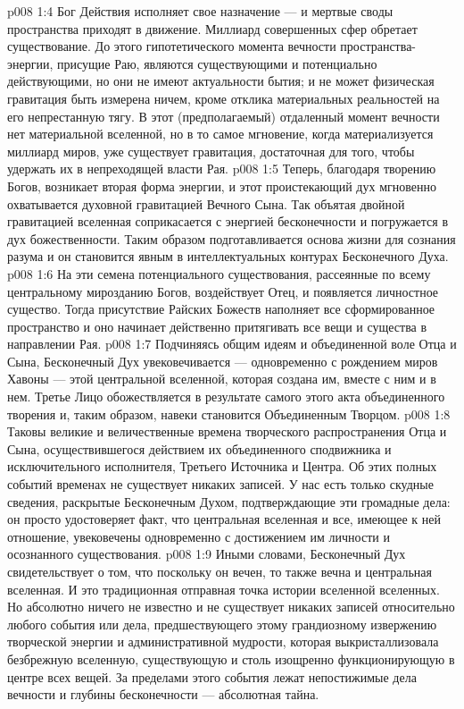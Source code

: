 \vs p008 1:4 \pc Бог Действия исполняет свое назначение --- и мертвые своды пространства приходят в движение. Миллиард совершенных сфер обретает существование. До этого гипотетического момента вечности пространства\hyp{}энергии, присущие Раю, являются существующими и потенциально действующими, но они не имеют актуальности бытия; и не может физическая гравитация быть измерена ничем, кроме отклика материальных реальностей на его непрестанную тягу. В этот (предполагаемый) отдаленный момент вечности нет материальной вселенной, но в то самое мгновение, когда материализуется миллиард миров, уже существует гравитация, достаточная для того, чтобы удержать их в непреходящей власти Рая.
\vs p008 1:5 Теперь, благодаря творению Богов, возникает вторая форма энергии, и этот проистекающий дух мгновенно охватывается духовной гравитацией Вечного Сына. Так объятая двойной гравитацией вселенная соприкасается с энергией бесконечности и погружается в дух божественности. Таким образом подготавливается основа жизни для сознания разума и он становится явным в интеллектуальных контурах Бесконечного Духа.
\vs p008 1:6 На эти семена потенциального существования, рассеянные по всему центральному мирозданию Богов, воздействует Отец, и появляется личностное существо. Тогда присутствие Райских Божеств наполняет все сформированное пространство и оно начинает действенно притягивать все вещи и существа в направлении Рая.
\vs p008 1:7 \pc Подчиняясь общим идеям и объединенной воле Отца и Сына, Бесконечный Дух увековечивается --- одновременно с рождением миров Хавоны --- этой центральной вселенной, которая создана им, вместе с ним и в нем. Третье Лицо обожествляется в результате самого этого акта объединенного творения и, таким образом, навеки становится Объединенным Творцом.
\vs p008 1:8 \pc Таковы великие и величественные времена творческого распространения Отца и Сына, осуществившегося действием их объединенного сподвижника и исключительного исполнителя, Третьего Источника и Центра. Об этих полных событий временах не существует никаких записей. У нас есть только скудные сведения, раскрытые Бесконечным Духом, подтверждающие эти громадные дела: он просто удостоверяет факт, что центральная вселенная и все, имеющее к ней отношение, увековечены одновременно с достижением им личности и осознанного существования.
\vs p008 1:9 Иными словами, Бесконечный Дух свидетельствует о том, что поскольку он вечен, то также вечна и центральная вселенная. И это традиционная отправная точка истории вселенной вселенных. Но абсолютно ничего не известно и не существует никаких записей относительно любого события или дела, предшествующего этому грандиозному извержению творческой энергии и административной мудрости, которая выкристаллизовала безбрежную вселенную, существующую и столь изощренно функционирующую в центре всех вещей. За пределами этого события лежат непостижимые дела вечности и глубины бесконечности --- абсолютная тайна.
